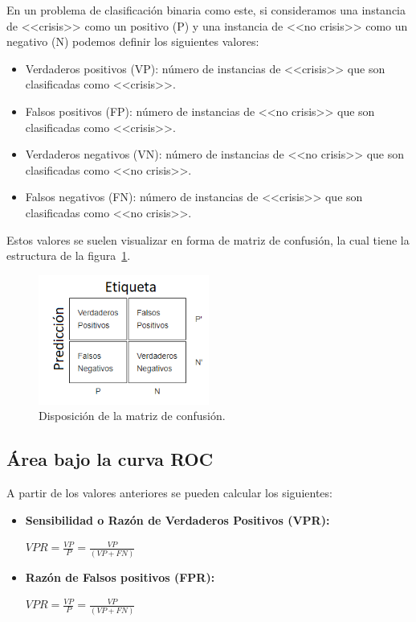 En un problema de clasificación binaria como este, si consideramos una instancia de <<crisis>> como un positivo (P) y una instancia de <<no crisis>> como un negativo (N) podemos definir los siguientes valores: 

\begin{itemize}
	\item Verdaderos positivos (VP): número de instancias de <<crisis>> que son clasificadas como <<crisis>>. 
	\item Falsos positivos (FP): número de instancias de <<no crisis>> que son clasificadas como <<crisis>>. 
	\item Verdaderos negativos (VN): número de instancias de <<no crisis>> que son clasificadas como <<no crisis>>. 
	\item Falsos negativos (FN): número de instancias de <<crisis>> que son clasificadas como <<no crisis>>.  
\end{itemize}

Estos valores se suelen visualizar en forma de matriz de confusión, la cual tiene la estructura de la figura~\ref{fig:matrizconfusion}.

\begin{figure}[H]
	\centering
	\includegraphics[width=0.5\textwidth]{../img/matrizconfusion.png}
	\caption{Disposición de la matriz de confusión.}
	\label{fig:matrizconfusion}
\end{figure}  

\subsection{Área bajo la curva ROC}

A partir de los valores anteriores se pueden calcular los siguientes: 

\begin{itemize}
	\item \textbf{Sensibilidad o Razón de Verdaderos Positivos (VPR):}
	\begin{center}
		$VPR=\frac{VP}{P}=\frac{VP}{(VP+FN)}$ 
	\end{center} 
	\item \textbf{Razón de Falsos positivos (FPR):} 
	\begin{center}
		$VPR=\frac{VP}{P}=\frac{VP}{(VP+FN)}$ 
	\end{center} 
\end{itemize}

